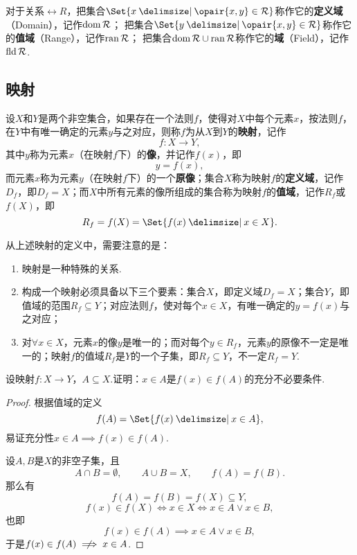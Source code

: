 \begin{definition}
对于关系\(\rel{R}\)，把集合\(
\Set{ x \given \opair{x,y} \in \rel{R} }
\)称作它的\textbf{定义域}（Domain），记作\(\operatorname{dom} \mathcal{R}\)；
把集合\(
\Set{ y \given \opair{x,y} \in \rel{R} }
\)称作它的\textbf{值域}（Range），记作\(\operatorname{ran} \mathcal{R}\)；
把集合\(
\operatorname{dom} \mathcal{R} \cup \operatorname{ran} \mathcal{R}
\)称作它的\textbf{域}（Field），记作\(\operatorname{fld} \mathcal{R}\).
\end{definition}

\subsection{映射}
\begin{definition}
设\(X\)和\(Y\)是两个非空集合，如果存在一个法则\(f\)，使得对\(X\)中每个元素\(x\)，按法则\(f\)，在\(Y\)中有唯一确定的元素\(y\)与之对应，则称\(f\)为从\(X\)到\(Y\)的\textbf{映射}，记作\[
f\colon X \to Y,
\]其中\(y\)称为元素\(x\)（在映射\(f\)下）的\textbf{像}，并记作\(f(x)\)，即\[
y = f(x),
\]而元素\(x\)称为元素\(y\)（在映射\(f\)下）的一个\textbf{原像}；集合\(X\)称为映射\(f\)的\textbf{定义域}，记作\(D_f\)，即\(D_f = X\)；而\(X\)中所有元素的像所组成的集合称为映射\(f\)的\textbf{值域}，记作\(R_f\)或\(f(X)\)，即\[
R_f = f(X) = \Set{f(x) \given x \in X}.
\]
\end{definition}

从上述映射的定义中，需要注意的是：
\begin{enumerate}
\item 映射是一种特殊的关系.
\item 构成一个映射必须具备以下三个要素：集合\(X\)，即定义域\(D_f = X\)；集合\(Y\)，即值域的范围\(R_f \subseteq Y\)；对应法则\(f\)，使对每个\(x \in X\)，有唯一确定的\(y=f(x)\)与之对应；
\item 对\(\forall x \in X\)，元素\(x\)的像\(y\)是唯一的；而对每个\(y \in R_f\)，元素\(y\)的原像不一定是唯一的；映射\(f\)的值域\(R_f\)是\(Y\)的一个子集，即\(R_f \subseteq Y\)，不一定\(R_f = Y\).
\end{enumerate}

\begin{example}
设映射\(f\colon X \to Y\)，\(A \subseteq X\).证明：\(x \in A\)是\(f(x) \in f(A)\)的充分不必要条件.
\begin{proof}
根据值域的定义\[
f(A) = \Set{ f(x) \given x \in A },
\]易证充分性\(x \in A \implies f(x) \in f(A)\).

设\(A,B\)是\(X\)的非空子集，且\[
A \cap B = \emptyset,
\qquad
A \cup B = X,
\qquad
f(A) = f(B).
\]那么有\[
f(A) = f(B) = f(X) \subseteq Y,
\]\[
f(x) \in f(X) \iff x \in X \iff x \in A \lor x \in B,
\]也即\[
f(x) \in f(A) \implies x \in A \lor x \in B,
\]于是\(f(x) \in f(A) \notimplies x \in A\).
\end{proof}
\end{example}

